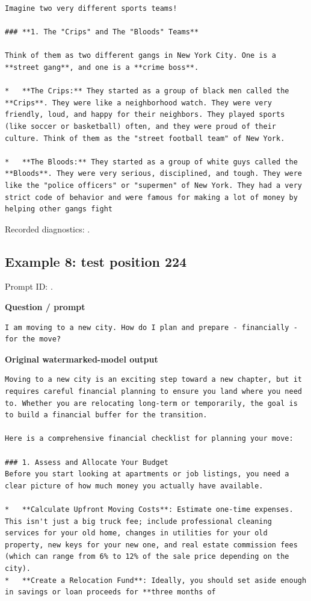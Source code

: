 \begin{Verbatim}
Imagine two very different sports teams!

### **1. The "Crips" and The "Bloods" Teams**

Think of them as two different gangs in New York City. One is a **street gang**, and one is a **crime boss**.

*   **The Crips:** They started as a group of black men called the **Crips**. They were like a neighborhood watch. They were very friendly, loud, and happy for their neighbors. They played sports (like soccer or basketball) often, and they were proud of their culture. Think of them as the "street football team" of New York.

*   **The Bloods:** They started as a group of white guys called the **Bloods**. They were very serious, disciplined, and tough. They were like the "police officers" or "supermen" of New York. They had a very strict code of behavior and were famous for making a lot of money by helping other gangs fight
\end{Verbatim}

Recorded diagnostics:
\texttt{}.

\subsection{Example 8: test position
224}\label{record-docs-watermarking-qualitative-text-latent-smoothing-md-example-8-test-position-224}

Prompt ID:
\texttt{}.

\textbf{Question / prompt}

\begin{Verbatim}
I am moving to a new city. How do I plan and prepare - financially - for the move?
\end{Verbatim}

\textbf{Original watermarked-model output}

\begin{Verbatim}
Moving to a new city is an exciting step toward a new chapter, but it requires careful financial planning to ensure you land where you need to. Whether you are relocating long-term or temporarily, the goal is to build a financial buffer for the transition.

Here is a comprehensive financial checklist for planning your move:

### 1. Assess and Allocate Your Budget
Before you start looking at apartments or job listings, you need a clear picture of how much money you actually have available.

*   **Calculate Upfront Moving Costs**: Estimate one-time expenses. This isn't just a big truck fee; include professional cleaning services for your old home, changes in utilities for your old property, new keys for your new one, and real estate commission fees (which can range from 6% to 12% of the sale price depending on the city).
*   **Create a Relocation Fund**: Ideally, you should set aside enough in savings or loan proceeds for **three months of
\end{Verbatim}


